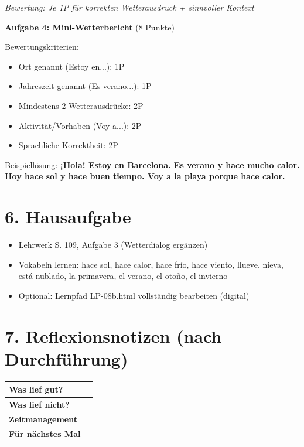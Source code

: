 \documentclass[11pt, a4paper]{article}
\newcommand{\loesung}[1]{\textcolor{loesung}{\textbf{#1}}}
\begin{document}
\textit{Bewertung: Je 1P für korrekten Wetterausdruck + sinnvoller Kontext}

\vspace{1em}

\textbf{Aufgabe 4: Mini-Wetterbericht} (8 Punkte)

Bewertungskriterien:
\begin{itemize}
    \item Ort genannt (Estoy en...): 1P
    \item Jahreszeit genannt (Es verano...): 1P
    \item Mindestens 2 Wetterausdrücke: 2P
    \item Aktivität/Vorhaben (Voy a...): 2P
    \item Sprachliche Korrektheit: 2P
\end{itemize}

Beispiellösung: \loesung{¡Hola! Estoy en Barcelona. Es verano y hace mucho calor. Hoy hace sol y hace buen tiempo. Voy a la playa porque hace calor.}


\section*{6. Hausaufgabe}

\begin{itemize}
    \item Lehrwerk S. 109, Aufgabe 3 (Wetterdialog ergänzen)
    \item Vokabeln lernen: hace sol, hace calor, hace frío, hace viento, llueve, nieva, está nublado, la primavera, el verano, el otoño, el invierno
    \item Optional: Lernpfad LP-08b.html vollständig bearbeiten (digital)
\end{itemize}


\section*{7. Reflexionsnotizen (nach Durchführung)}

\begin{tabularx}{\textwidth}{|l|X|}
\hline
\textbf{Was lief gut?} & \\[2em]
\hline
\textbf{Was lief nicht?} & \\[2em]
\hline
\textbf{Zeitmanagement} & \\[2em]
\hline
\textbf{Für nächstes Mal} & \\[2em]
\hline
\end{tabularx}
\end{document}
